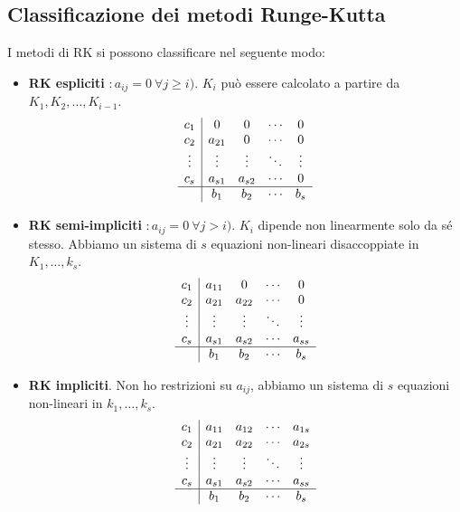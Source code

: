 \subsection{Classificazione dei metodi Runge-Kutta}
I metodi di RK si possono classificare nel seguente modo:
\begin{itemize}
\item \textbf{RK espliciti} $: a_{ij} =0 \ \forall j\geqslant i)$. $K_{i}$ può essere calcolato a partire da $K_{1} ,K_{2} ,\dotsc ,K_{i-1}$.
\begin{equation*}
\begin{array}{ c|c c c c }
c_{1} & 0 & 0 & \cdots  & 0\\
c_{2} & a_{21} & 0 & \cdots  & 0\\
\vdots  & \vdots  & \vdots  & \ddots  & \vdots \\
c_{s} & a_{s1} & a_{s2} & \cdots  & 0\\
\hline
 & b_{1} & b_{2} & \cdots  & b_{s}
\end{array}
\end{equation*}

\item \textbf{RK semi-impliciti} $: a_{ij} =0 \ \forall j >i)$. $K_{i}$ dipende non linearmente solo da sé stesso. Abbiamo un sistema di $s$ equazioni non-lineari disaccoppiate in $K_{1} ,\dotsc ,k_{s}$.
\begin{equation*}
\begin{array}{ c|c c c c }
c_{1} & a_{11} & 0 & \cdots  & 0\\
c_{2} & a_{21} & a_{22} & \cdots  & 0\\
\vdots  & \vdots  & \vdots  & \ddots  & \vdots \\
c_{s} & a_{s1} & a_{s2} & \cdots  & a_{ss}\\
\hline
 & b_{1} & b_{2} & \cdots  & b_{s}
\end{array}
\end{equation*}

\item \textbf{RK impliciti}. Non ho restrizioni su $a_{ij}$, abbiamo un sistema di $s$ equazioni non-lineari in $k_{1} ,\dotsc ,k_{s}$.
\begin{equation*}
\begin{array}{ c|c c c c }
c_{1} & a_{11} & a_{12} & \cdots  & a_{1s}\\
c_{2} & a_{21} & a_{22} & \cdots  & a_{2s}\\
\vdots  & \vdots  & \vdots  & \ddots  & \vdots \\
c_{s} & a_{s1} & a_{s2} & \cdots  & a_{ss}\\
\hline
 & b_{1} & b_{2} & \cdots  & b_{s}
\end{array}
\end{equation*}
\end{itemize}

